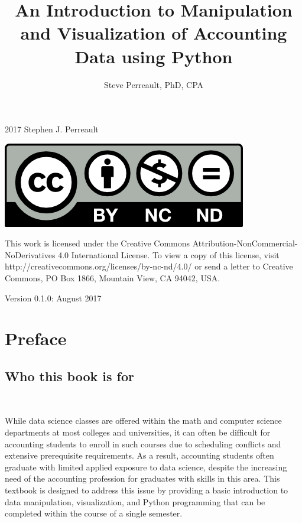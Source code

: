 \documentclass{book}
\begin{document}
\frontmatter
\pagestyle{plain}
\begin{titlepage}
	\title {\huge \textbf{An Introduction to Manipulation and Visualization of Accounting Data using Python }}
	\date{}
	\author{Steve Perreault, PhD, CPA}
	\maketitle
\end{titlepage}
\begingroup
	\parindent 0pt
	\parskip \baselineskip 
	\textcopyright{} 2017 Stephen J. Perreault 
	
	\begin {center}
	\includegraphics  [scale=1.5]{creative_commons_license}
	\end {center}
	
	This work is licensed under the Creative Commons Attribution-NonCommercial-NoDerivatives 4.0 International License. To view a copy of this license, visit http://creativecommons.org/licenses/by-nc-nd/4.0/ or send a letter to Creative Commons, PO Box 1866, Mountain View, CA 94042, USA.
	
	Version 0.1.0: August 2017
\endgroup
\tableofcontents


\mainmatter	
\parindent 0pt
\parskip \baselineskip 

\chapter{Preface}
\section{Who this book is for}\

 While data science classes are offered within the math and computer science departments at most colleges and universities, it can often be difficult for accounting students to enroll in such courses due to scheduling conflicts and extensive prerequisite requirements. As a result, accounting students often graduate with limited applied exposure to data science, despite the increasing need of the accounting profession for graduates with skills in this area. This textbook is designed to address this issue by providing a basic introduction to data manipulation, visualization, and Python programming that can be completed within the course of a single semester. 
\end{document}
